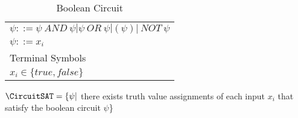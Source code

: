 

\begin{table}[]
	\centering
	\caption{Boolean Circuit }
	\label{my-label}
	\begin{tabular}{@{}l@{}}
		\toprule
		$\psi ::= \psi \ AND \  \psi | \psi \ OR \  \psi | (\psi) | \ NOT \ \psi $ \\
		 $ \psi ::= x_i$ \\
		Terminal Symbols \\
		$x_i \in \{true, false\} $  \\		
		\bottomrule
	\end{tabular}
\end{table}

\noindent $\CircuitSAT = \{ \psi |$ there exists truth value assignments of each input $x_i$ that satisfy the boolean circuit $\psi$\} \\
